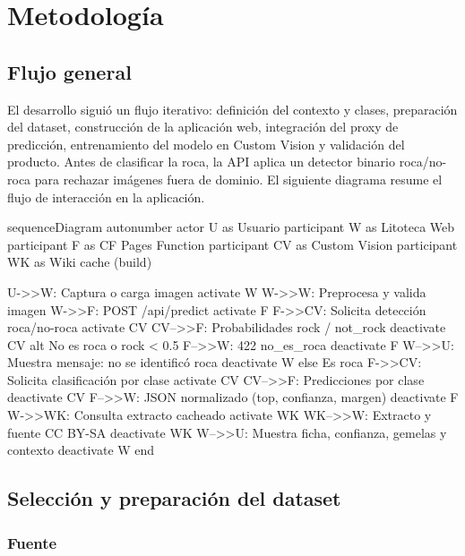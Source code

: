 \chapter{Metodología}
\label{ch:methodology}

\section{Flujo general}

El desarrollo siguió un flujo iterativo: definición del contexto y clases,
preparación del dataset, construcción de la aplicación web, integración del proxy
de predicción, entrenamiento del modelo en Custom Vision y validación del producto.
Antes de clasificar la roca, la API aplica un detector binario roca/no-roca para
rechazar imágenes fuera de dominio. El siguiente diagrama resume el flujo de
interacción en la aplicación.

\begin{mermaid}[style=editorial, width=0.95\linewidth, pos=H, caption={Flujo general de predicción en Litoteca}]
  sequenceDiagram
    autonumber
    actor U as Usuario
    participant W as Litoteca Web
    participant F as CF Pages Function
    participant CV as Custom Vision
    participant WK as Wiki cache (build)

    U->>W: Captura o carga imagen
    activate W
    W->>W: Preprocesa y valida imagen
    W->>F: POST /api/predict
    activate F
    F->>CV: Solicita detección roca/no-roca
    activate CV
    CV-->>F: Probabilidades rock / not_rock
    deactivate CV
    alt No es roca o rock < 0.5
      F-->>W: 422 no_es_roca
      deactivate F
      W-->>U: Muestra mensaje: no se identificó roca
      deactivate W
    else Es roca
      F->>CV: Solicita clasificación por clase
      activate CV
      CV-->>F: Predicciones por clase
      deactivate CV
      F-->>W: JSON normalizado (top, confianza, margen)
      deactivate F
      W->>WK: Consulta extracto cacheado
      activate WK
      WK-->>W: Extracto y fuente CC BY-SA
      deactivate WK
      W-->>U: Muestra ficha, confianza, gemelas y contexto
      deactivate W
    end
\end{mermaid}

\section{Selección y preparación del dataset}

\subsection{Fuente}

